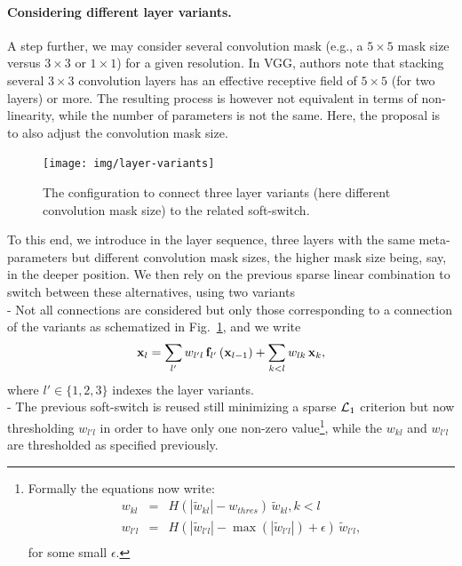 \documentclass[twocolumn]{article}
\begin{document}
\paragraph*{Considering different layer variants.}

A step further, we may consider several convolution mask (e.g., a $5 \times 5$ mask size versus $3 \times 3$ or $1 \times 1$) for a given resolution. In VGG, authors note that stacking several $3 \times 3$ convolution layers has an effective receptive field of $5 \times 5$ (for two layers) or more. The resulting process is however not equivalent in terms of non-linearity, while the number of parameters is not the same. Here, the proposal is to also adjust the convolution mask size. 

\begin{figure}
\centering
\texttt{[image: img/layer-variants]}
\caption{The configuration to connect three layer variants (here different convolution mask size) to the related soft-switch.}
\label{layer-variants}
\end{figure}

To this end, we introduce in the layer sequence, three layers with the same meta-parameters but different convolution mask sizes, the higher mask size being, say, in the deeper position. We then rely on the previous sparse linear combination to switch between these alternatives, using two variants
\\- Not all connections are considered but only those corresponding to a connection of the variants as schematized in Fig.~\ref{layer-variants}, and we write $${\bf x}_l = \sum_{l'} w_{l'l} \, {\bf f}_{l'}\left({\bf x}_{l-1}\right) + \sum_{k < l} w_{lk} \, {\bf x}_k,$$ where $l' \in \{1, 2, 3\}$ indexes the layer variants.
\\ - The previous soft-switch is reused still minimizing a sparse ${\cal L}_1$ criterion but now thresholding $w_{l'l}$ in order to have only one non-zero value\footnote{Formally the equations now write: $$\begin{array}{rcl}
w_{kl} &=& H(|\tilde{w}_{kl}| - w_{thres})\, \tilde{w}_{kl}, k < l\\
w_{l'l} &=& H(|\tilde{w}_{l'l}| - \max(|\tilde{w}_{l'l}|) + \epsilon)\, \tilde{w}_{l'l},\\
\end{array}$$ for some small $\epsilon$.}, while the $w_{kl}$ and $w_{l'l}$ are thresholded as specified previously.
\end{document}
